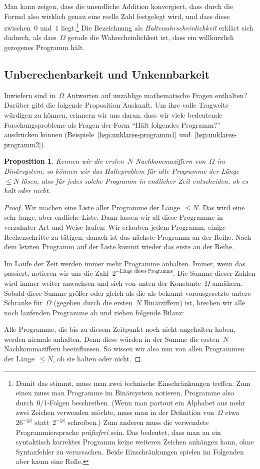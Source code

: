 \documentclass[twoside]{../zirkelblatt1415}
\theoremstyle{definition}
\theoremstyle{plain}
\newtheorem{prop}[defn]{Proposition}
\theoremstyle{remark}
\begin{document}
Man kann zeigen, dass die unendliche Addition konvergiert, dass durch die
Formel also wirklich genau eine reelle Zahl festgelegt wird, und dass diese
zwischen~$0$ und~$1$ liegt.\footnote{Damit das stimmt, muss man zwei technische
Einschränkungen treffen. Zum einen muss man Programme im Binärsystem notieren,
Programme also durch~0/1-Folgen beschreiben. (Wenn man partout ein Alphabet
aus mehr zwei Zeichen verwenden möchte, muss man in der Definition von~$\Omega$
etwa~$26^{-|p|}$ statt~$2^{-|p|}$ schreiben.) Zum anderen muss die
verwendete Programmiersprache \emph{präfixfrei} sein. Das bedeutet, dass man an
ein syntaktisch korrektes Programm keine weiteren Zeichen anhängen kann, ohne
Syntaxfehler zu verursachen. Beide Einschränkungen spielen im Folgenden aber
kaum eine Rolle.} Die Bezeichnung als \emph{Haltewahrscheinlichkeit} erklärt
sich dadurch, als dass~$\Omega$ gerade die Wahrscheinlichkeit ist, dass ein
willkürzlich gezogenes Programm hält.


\subsection{Unberechenbarkeit und Unkennbarkeit}

Inwiefern sind in~$\Omega$ Antworten auf unzählige mathematische Fragen
enthalten? Darüber gibt die folgende Proposition Auskunft. Um ihre volle
Tragweite würdigen zu können, erinnern wir uns daran, dass wir viele
bedeutende Forschungsprobleme als Fragen der Form "`Hält folgendes Programm?"'
ausdrücken können (Beispiele~\ref{bsp:unklares-programm1}
und~\ref{bsp:unklares-programm2}).

\begin{prop}Kennen wir die ersten~$N$ Nachkommaziffern von~$\Omega$ im
Binärsystem, so können wir das Halteproblem für alle Programme der Länge~$\leq
N$ lösen, also für jedes solche Programm in endlicher Zeit entscheiden, ob es
hält oder nicht.\end{prop}
\begin{proof}Wir machen eine Liste aller Programme der Länge~$\leq N$. Das wird
eine sehr lange, aber endliche Liste. Dann lassen wir all diese Programme
in verzahnter Art und Weise laufen: Wir erlauben jedem Programm, einige
Rechenschritte zu tätigen; danach ist das nächste Programm an der Reihe. Nach
dem letzten Programm auf der Liste kommt wieder das erste an der Reihe.

Im Laufe der Zeit werden immer mehr Programme anhalten. Immer, wenn das
passiert, notieren wir uns die Zahl~$2^{-\text{Länge dieses
Programms}}$. Die Summe dieser Zahlen wird immer weiter anwachsen und sich von
unten der Konstante~$\Omega$ annähern. Sobald diese Summe größer oder gleich
als die als bekannt vorausgesetzte untere Schranke für~$\Omega$ (gegeben durch
die ersten~$N$ Binärziffern) ist, brechen wir alle noch laufenden Programme ab
und ziehen folgende Bilanz:

Alle Programme, die bis zu diesem Zeitpunkt noch nicht angehalten haben, werden
niemals anhalten. Denn diese würden in der Summe die ersten~$N$
Nachkommaziffern beeinflussen. So wissen wir also nun von allen Programmen der
Länge~$\leq N$, ob sie halten oder nicht.
\end{proof}
\end{document}
